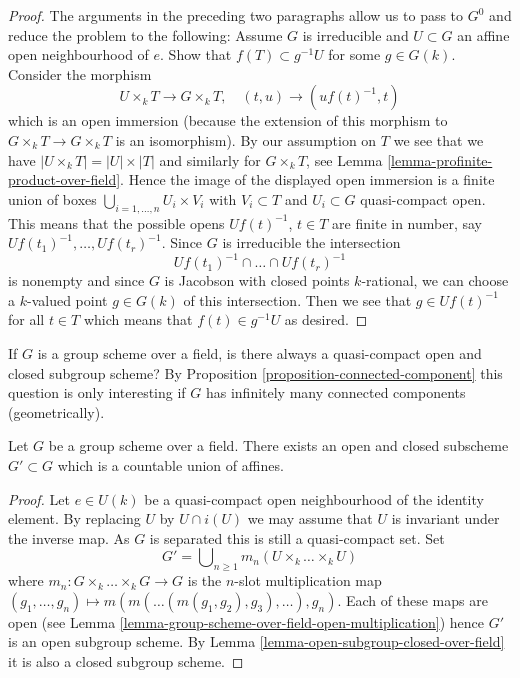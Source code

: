 \begin{proof}
\medskip\noindent
The arguments in the preceding two paragraphs allow us to pass to $G^0$
and reduce the problem to the following:
Assume $G$ is irreducible and $U \subset G$ an affine
open neighbourhood of $e$. Show that $f(T) \subset g^{-1}U$
for some $g \in G(k)$. Consider the morphism
$$
U \times_k T \longrightarrow G \times_k T,\quad
(t, u) \longrightarrow (uf(t)^{-1}, t)
$$
which is an open immersion (because the extension of this morphism to
$G \times_k T \to G \times_k T$ is an isomorphism).
By our assumption on $T$ we see that we have $|U \times_k T| = |U| \times |T|$
and similarly for $G \times_k T$, see
Lemma \ref{lemma-profinite-product-over-field}.
Hence the image of the displayed open immersion is a finite union
of boxes $\bigcup_{i = 1, \ldots, n} U_i \times V_i$ with
$V_i \subset T$ and $U_i \subset G$ quasi-compact open. This means that
the possible opens $Uf(t)^{-1}$, $t \in T$ are finite in number, say
$Uf(t_1)^{-1}, \ldots, Uf(t_r)^{-1}$. Since $G$ is irreducible the
intersection
$$
Uf(t_1)^{-1} \cap \ldots \cap Uf(t_r)^{-1}
$$
is nonempty and since $G$ is Jacobson with closed points $k$-rational,
we can choose a $k$-valued point $g \in G(k)$ of this intersection.
Then we see that $g \in Uf(t)^{-1}$ for all $t \in T$ which
means that $f(t) \in g^{-1}U$ as desired.
\end{proof}

\begin{remark}
\label{remark-easy}
If $G$ is a group scheme over a field, is there always a quasi-compact
open and closed subgroup scheme? By
Proposition \ref{proposition-connected-component}
this question is only interesting if $G$ has infinitely many connected
components (geometrically).
\end{remark}

\begin{lemma}
\label{lemma-group-scheme-field-countable-affine}
Let $G$ be a group scheme over a field.
There exists an open and closed subscheme $G' \subset G$
which is a countable union of affines.
\end{lemma}

\begin{proof}
Let $e \in U(k)$ be a quasi-compact open neighbourhood of the identity
element. By replacing $U$ by $U \cap i(U)$ we may assume that
$U$ is invariant under the inverse map. As $G$ is separated this is
still a quasi-compact set. Set
$$
G' = \bigcup\nolimits_{n \geq 1} m_n(U \times_k \ldots \times_k U)
$$
where $m_n : G \times_k \ldots \times_k G \to G$ is the $n$-slot
multiplication map
$(g_1, \ldots, g_n) \mapsto m(m(\ldots (m(g_1, g_2), g_3), \ldots ), g_n)$.
Each of these maps are open (see
Lemma \ref{lemma-group-scheme-over-field-open-multiplication})
hence $G'$ is an open subgroup scheme. By
Lemma \ref{lemma-open-subgroup-closed-over-field}
it is also a closed subgroup scheme.
\end{proof}






